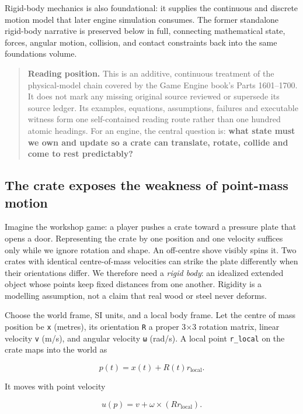 Rigid-body mechanics is also foundational: it supplies the continuous and discrete motion model that later engine simulation consumes. The former standalone rigid-body narrative is preserved below in full, connecting mathematical state, forces, angular motion, collision, and contact constraints back into the same foundations volume.

\begin{quote}
\textbf{Reading position.} This is an additive, continuous treatment of the physical-model chain covered by the Game Engine book's Parts 1601--1700. It does not mark any missing original source reviewed or supersede its source ledger. Its examples, equations, assumptions, failures and executable witness form one self-contained reading route rather than one hundred atomic headings. For an engine, the central question is: \textbf{what state must we own and update so a crate can translate, rotate, collide and come to rest predictably?}
\end{quote}

\subsection{The crate exposes the weakness of point-mass motion}\label{02-foundations-ii-ch039-the-crate-exposes-the-weakness-of-point-mass-motion}

Imagine the workshop game: a player pushes a crate toward a pressure plate that opens a door. Representing the crate by one position and one velocity suffices only while we ignore rotation and shape. An off-centre shove visibly spins it. Two crates with identical centre-of-mass velocities can strike the plate differently when their orientations differ. We therefore need a \emph{rigid body}: an idealized extended object whose points keep fixed distances from one another. Rigidity is a modelling assumption, not a claim that real wood or steel never deforms.

Choose the world frame, SI units, and a local body frame. Let the centre of mass position be \texttt{x} (metres), its orientation \texttt{R} a proper 3×3 rotation matrix, linear velocity \texttt{v} (m/s), and angular velocity \texttt{ω} (rad/s). A local point \texttt{r\_local} on the crate maps into the world as

\[
p(t)=x(t)+R(t)r_{\mathrm{local}}.
\]

It moves with point velocity

\[
u(p)=v+\omega\times(Rr_{\mathrm{local}}).
\]

